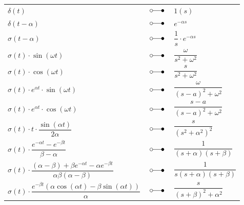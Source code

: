 \begin{minipage}{9cm}
\begin{center}
	\begin{tabular}{p{5cm}p{0.75cm}p{3cm}}
	
		$\delta \left( t \right)$ & $\; \laplace \;$ & $1\left( s \right)$ \\
		
		$\delta \left( t - \alpha \right)$ & $\; \laplace \;$ & $e^{- \alpha s}$\\
		
		$\sigma\left( t - \alpha \right)$ & $\; \laplace \;$ & $ \dfrac{1}{s} \cdot e^{- \alpha s}$\\
		
		$\sigma \left( t \right) \cdot \sin \left(\omega t \right)$ & $\; \laplace \;$ &
		$\dfrac{\omega}{s^2 + {\omega^2}}$\\
		
		$\sigma \left( t \right) \cdot \cos \left( \omega t \right)$ & $\; \laplace \;$ &
		$\dfrac{s}{ s^2 + \omega^2}$\\
		
		$\sigma \left( t \right) \cdot  e^{ \alpha t} \cdot \sin \left(\omega t \right)$ & $\; \laplace \;$ 
		& 	$\dfrac{\omega}{(s-a)^2 + {\omega^2}}$\\
		$\sigma \left( t \right) \cdot e^{ \alpha t} \cdot \cos \left( \omega t \right) $ & $\; \laplace \;$ &
		$\dfrac{s-a}{(s-a)^2 + \omega^2}$\\
		
		$\sigma \left( t \right)\cdot t \cdot \dfrac{\sin \left( \alpha t \right)} { 2 \alpha }$ & $\; \laplace \;$ & $\dfrac{s}{ \left(s^ {2}+ \alpha ^{2} \right)^{2}}$ \\
		
		$\sigma \left( t \right)\cdot \dfrac { e ^ { - \alpha t } - e ^ { - \beta t } } { \beta - \alpha }$ & $\; \laplace \;$ & $\dfrac { 1 } { ( s + \alpha ) ( s + \beta ) }$\\
		
		$\sigma \left( t \right)\cdot \dfrac {(\alpha - \beta) +\beta e ^ { - \alpha t } - \alpha e ^ { - \beta t } } { \alpha \beta (\alpha - \beta) }$ & $\; \laplace \;$ & $\dfrac { 1 } {s ( s + \alpha ) ( s + \beta ) }$\\
		
		$\sigma \left( t \right)\cdot \dfrac { e ^ { - \beta t } ( \alpha \cos ( \alpha t ) - \beta \sin ( \alpha t ) ) } { \alpha }$& $\; \laplace \;$ & $\dfrac { s } { ( s + \beta ) ^ { 2 } + \alpha ^ { 2 } }$\\
		
		 
		
		
	\end{tabular}
\end{center}
\end{minipage}


